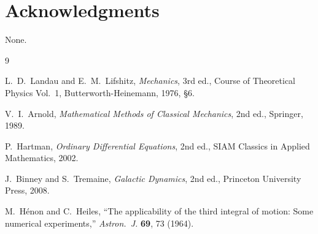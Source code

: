 \documentclass[11pt]{article}
\theoremstyle{definition}
\theoremstyle{remark}
\begin{document}
\section*{Acknowledgments}
None.

\begin{thebibliography}{9}

L.~D.~Landau and E.~M.~Lifshitz, \emph{Mechanics}, 3rd ed., Course of
Theoretical Physics Vol.~1, Butterworth-Heinemann, 1976, \S6.

V.~I.~Arnold, \emph{Mathematical Methods of Classical Mechanics}, 2nd ed.,
Springer, 1989.

P.~Hartman, \emph{Ordinary Differential Equations}, 2nd ed., SIAM
Classics in Applied Mathematics, 2002.

J.~Binney and S.~Tremaine, \emph{Galactic Dynamics}, 2nd ed., Princeton
University Press, 2008.

M.~H\'enon and C.~Heiles, ``The applicability of the third integral of
motion: Some numerical experiments,'' \emph{Astron.\ J.} \textbf{69}, 73
(1964).

\end{thebibliography}
\end{document}
